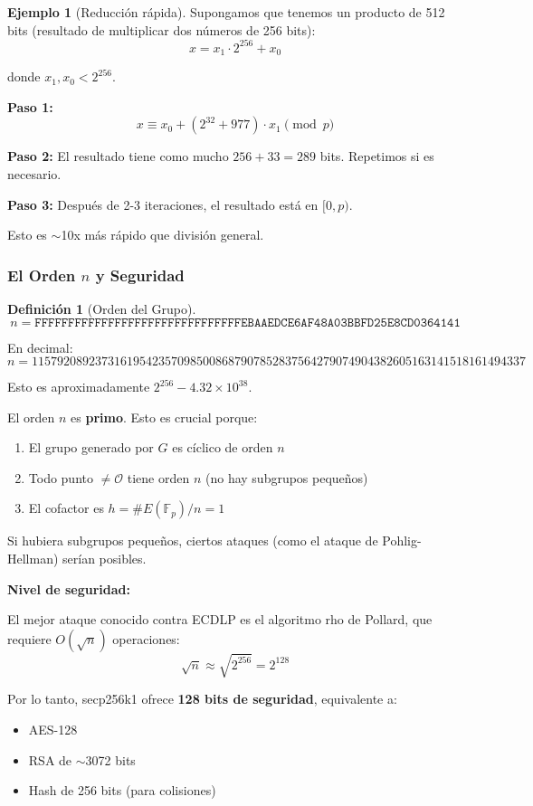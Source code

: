 \documentclass[11pt,a4paper,twoside,openright]{book}
\theoremstyle{definition}
\newtheorem{definition}{Definición}[chapter]
\newtheorem{example}{Ejemplo}[chapter]
\theoremstyle{plain}
\theoremstyle{remark}
\newcommand{\Fp}{\mathbb{F}_p}
\begin{document}
\begin{example}[Reducción rápida]
Supongamos que tenemos un producto de 512 bits (resultado de multiplicar dos números de 256 bits):
\[ x = x_1 \cdot 2^{256} + x_0 \]

donde $x_1, x_0 < 2^{256}$.

\textbf{Paso 1:}
\[ x \equiv x_0 + (2^{32} + 977) \cdot x_1 \pmod{p} \]

\textbf{Paso 2:} El resultado tiene como mucho $256 + 33 = 289$ bits. Repetimos si es necesario.

\textbf{Paso 3:} Después de 2-3 iteraciones, el resultado está en $[0, p)$.

Esto es $\sim$10x más rápido que división general.
\end{example}

\subsubsection{El Orden $n$ y Seguridad}

\begin{definition}[Orden del Grupo]
\[ n = \texttt{FFFFFFFFFFFFFFFFFFFFFFFFFFFFFFFEBAAEDCE6AF48A03BBFD25E8CD0364141} \]

En decimal:
\[ n = 115792089237316195423570985008687907852837564279074904382605163141518161494337 \]

Esto es aproximadamente $2^{256} - 4.32 \times 10^{38}$.
\end{definition}

\begin{keyidea}
El orden $n$ es \textbf{primo}. Esto es crucial porque:
\begin{enumerate}
    \item El grupo generado por $G$ es cíclico de orden $n$
    \item Todo punto $\neq \mathcal{O}$ tiene orden $n$ (no hay subgrupos pequeños)
    \item El cofactor es $h = \#E(\Fp) / n = 1$
\end{enumerate}

Si hubiera subgrupos pequeños, ciertos ataques (como el ataque de Pohlig-Hellman) serían posibles.
\end{keyidea}

\begin{mathnote}
\textbf{Nivel de seguridad:}

El mejor ataque conocido contra ECDLP es el algoritmo rho de Pollard, que requiere $O(\sqrt{n})$ operaciones:
\[ \sqrt{n} \approx \sqrt{2^{256}} = 2^{128} \]

Por lo tanto, secp256k1 ofrece \textbf{128 bits de seguridad}, equivalente a:
\begin{itemize}
    \item AES-128
    \item RSA de $\sim$3072 bits
    \item Hash de 256 bits (para colisiones)
\end{itemize}
\end{mathnote}
\end{document}
